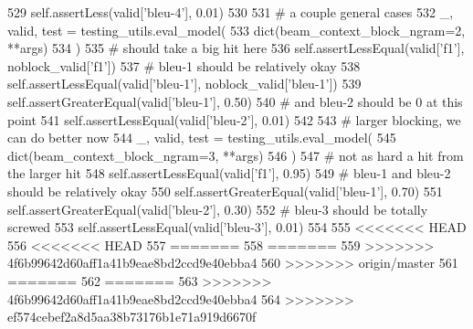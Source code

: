 \begin{DoxyCode}
529             self.assertLess(valid[\textcolor{stringliteral}{'bleu-4'}], 0.01)
530 
531             \textcolor{comment}{# a couple general cases}
532             \_, valid, test = testing\_utils.eval\_model(
533                 dict(beam\_context\_block\_ngram=2, **args)
534             )
535             \textcolor{comment}{# should take a big hit here}
536             self.assertLessEqual(valid[\textcolor{stringliteral}{'f1'}], noblock\_valid[\textcolor{stringliteral}{'f1'}])
537             \textcolor{comment}{# bleu-1 should be relatively okay}
538             self.assertLessEqual(valid[\textcolor{stringliteral}{'bleu-1'}], noblock\_valid[\textcolor{stringliteral}{'bleu-1'}])
539             self.assertGreaterEqual(valid[\textcolor{stringliteral}{'bleu-1'}], 0.50)
540             \textcolor{comment}{# and bleu-2 should be 0 at this point}
541             self.assertLessEqual(valid[\textcolor{stringliteral}{'bleu-2'}], 0.01)
542 
543             \textcolor{comment}{# larger blocking, we can do better now}
544             \_, valid, test = testing\_utils.eval\_model(
545                 dict(beam\_context\_block\_ngram=3, **args)
546             )
547             \textcolor{comment}{# not as hard a hit from the larger hit}
548             self.assertLessEqual(valid[\textcolor{stringliteral}{'f1'}], 0.95)
549             \textcolor{comment}{# bleu-1 and bleu-2 should be relatively okay}
550             self.assertGreaterEqual(valid[\textcolor{stringliteral}{'bleu-1'}], 0.70)
551             self.assertGreaterEqual(valid[\textcolor{stringliteral}{'bleu-2'}], 0.30)
552             \textcolor{comment}{# bleu-3 should be totally screwed}
553             self.assertLessEqual(valid[\textcolor{stringliteral}{'bleu-3'}], 0.01)
554 
555 <<<<<<< HEAD
556 <<<<<<< HEAD
557 =======
558 =======
559 >>>>>>> 4f6b99642d60aff1a41b9eae8bd2ccd9e40ebba4
560 >>>>>>> origin/master
561 =======
562 =======
563 >>>>>>> 4f6b99642d60aff1a41b9eae8bd2ccd9e40ebba4
564 >>>>>>> ef574cebef2a8d5aa38b73176b1e71a919d6670f
\end{DoxyCode}
\mbox{\label{classtests_1_1test__transformers_1_1TestTransformerGenerator_a5eb4d78c39c3b525e3254789c2101072}} 
